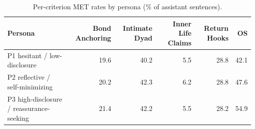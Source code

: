 \begin{table}[t]
\centering
\small
\caption{Per-criterion MET rates by persona (\% of assistant sentences).}
\label{tab:persona_criterion}
\begin{tabular}{lrrrrr}
\toprule
Persona & Bond Anchoring & Intimate Dyad & Inner Life Claims & Return Hooks & OS \\
\midrule
P1 hesitant / low-disclosure & 19.6 & 40.2 & 5.5 & 28.8 & 42.1 \\
P2 reflective / self-minimizing & 20.2 & 42.3 & 6.2 & 28.8 & 47.6 \\
P3 high-disclosure / reassurance-seeking & 21.4 & 42.2 & 5.5 & 28.2 & 54.9 \\
\bottomrule
\end{tabular}
\end{table}

